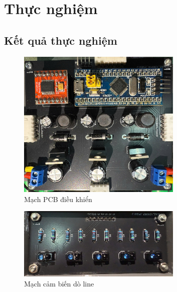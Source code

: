      \section{Thực nghiệm}
          \subsection{Kết quả thực nghiệm}
               \begin{figure}[H]
                    \centering
                    \includegraphics[width=0.7\textwidth]{pictures/chapter8/PCB.png}
                    \caption{Mạch PCB điều khiển}
                    \label{PCB}
               \end{figure}
               \begin{figure}[H]
                    \centering
                    \includegraphics[width=0.7\textwidth]{pictures/chapter8/sensor.png}
                    \caption{Mạch cảm biến dò line}
                    \label{line_sensor}
               \end{figure}
